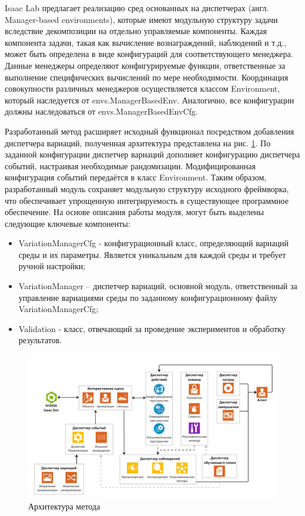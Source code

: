         Isaac Lab предлагает реализацию сред основанных на диспетчерах (англ. Manager-based environments), которые имеют модульную структуру задачи вследствие декомпозиции на отдельно управляемые компоненты. Каждая компонента задачи, такая как вычисление вознаграждений, наблюдений и т.д., может быть определена в виде конфигураций для соответствующего менеджера. Данные менеджеры определяют конфигурируемые функции, ответственные за выполнение специфических вычислений по мере необходимости. Координация совокупности различных менеджеров осуществляется классом Environment, который наследуется от envs.ManagerBasedEnv. Аналогично, все конфигурации должны наследоваться от envs.ManagerBasedEnvCfg.

        Разработанный метод расширяет исходный функционал посредством добавления диспетчера вариаций, полученная архитектура представлена на рис. \ref{fig:arch}. По заданной конфигурации диспетчер вариаций 
        дополняет конфигурацию диспетчера событий, настраивая необходимые рандомизации. Модифицированная конфигурация событий передаётся в класс Environment. Таким образом, разработанный модуль сохраняет модульную структуру исходного фреймворка, что обеспечивает упрощенную интегрируемость в существующее программное обеспечение. На основе описания работы модуля, могут быть выделены следующие ключевые компоненты:
            \begin{itemize}
                \item VariationManagerCfg - конфигурационный класс, определяющий вариаций среды и их параметры. Является уникальным для каждой среды и требует ручной настройки;
                \item VariationManager – диспетчер вариаций, основной модуль, ответственный за управление вариациями среды по заданному конфигурационному файлу VariationManagerCfg;
                \item Validation - класс, отвечающий за проведение экспериментов и обработку результатов.
            \end{itemize}
        
        \begin{figure}
            \begin{center}
                \includegraphics[width=1.0\textwidth]{images/Project Architecture.jpg}
            \caption{Архитектура метода}
            \label{fig:arch}
            \end{center}
        \end{figure}

